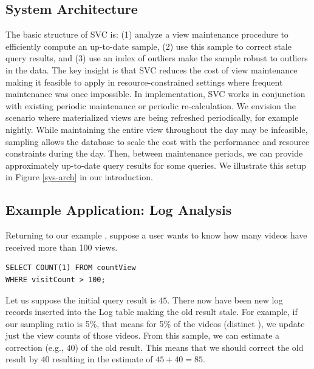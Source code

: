 \subsection{System Architecture}
The basic structure of SVC is: (1) analyze a view maintenance procedure to efficiently compute an up-to-date sample, (2) use this sample to correct stale query results, and (3) use an index of outliers make the sample robust to outliers in the data. 
The key insight is that SVC reduces the cost of view maintenance making it feasible to apply in resource-constrained settings where frequent maintenance was once impossible.
In implementation, SVC works in conjunction with existing periodic maintenance or periodic re-calculation.
We envision the scenario where materialized views are being refreshed periodically, for example nightly.
While maintaining the entire view throughout the day may be infeasible, sampling allows the database to scale the cost with the performance and resource constraints during the day.
Then, between maintenance periods, we can provide approximately up-to-date query results for some queries.
We illustrate this setup in Figure \ref{sys-arch} in our introduction.
 
\subsection{Example Application: Log Analysis}
Returning to our example , suppose a user wants to know how many videos have received more than 100 views.
\begin{lstlisting}[basicstyle={\scriptsize}]
SELECT COUNT(1) FROM countView 
WHERE visitCount > 100;
\end{lstlisting}
Let us suppose the initial query result is $45$.
There now have been new log records inserted into the Log table making the old result stale.
For example, if our sampling ratio is 5\%, that means for 5\% of the videos (distinct ), we update just the view counts of those videos.
From this sample, we can estimate a correction (e.g., $40$) of the old result.
This means that we should correct the old result by $40$ resulting in the estimate of $45+40 = 85$.
